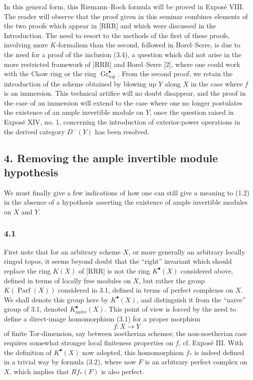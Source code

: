 \documentclass[11pt]{article}
\newcommand{\Gr}{\operatorname{Gr}}
\newcommand{\Parf}{\operatorname{Parf}}
\begin{document}
In this general form, this Riemann--Roch formula will be proved in Expos\'e VIII. The reader will observe that the proof given in this seminar combines elements of the two proofs which appear in [RRR] and which were discussed in the Introduction. The need to resort to the methods of the first of these proofs, involving more $K$-formalism than the second, followed in Borel--Serre, is due to the need for a proof of the inclusion (3.4), a question which did not arise in the more restricted framework of [RRR] and Borel--Serre [2], where one could work with the Chow ring or the ring $\Gr^\bullet_{\mathrm{top}}$. From the second proof, we retain the introduction of the scheme obtained by blowing up $Y$ along $X$ in the case where $f$ is an immersion. This technical artifice will no doubt disappear, and the proof in the case of an immersion will extend to the case where one no longer postulates the existence of an ample invertible module on $Y$, once the question raised in Expos\'e XIV, no. 1, concerning the introduction of exterior-power operations in the derived category $D^-(Y)$ has been resolved.

\subsection*{4. Removing the ample invertible module hypothesis}
We must finally give a few indications of how one can still give a meaning to (1.2) in the absence of a hypothesis asserting the existence of ample invertible modules on $X$ and $Y$.

\subsubsection*{4.1}
First note that for an arbitrary scheme $X$, or more generally an arbitrary locally ringed topos, it seems beyond doubt that the ``right'' invariant which should replace the ring $K(X)$ of [RRR] is not the ring $K^\bullet(X)$ considered above, defined in terms of locally free modules on $X$, but rather the group $K(\Parf(X))$ considered in 3.1, defined in terms of perfect complexes on $X$. We shall denote this group here by $K^\bullet(X)$, and distinguish it from the ``naive'' group of 3.1, denoted $K^\bullet_{\mathrm{naive}}(X)$. This point of view is forced by the need to define a direct-image homomorphism (3.1) for a proper morphism
\[
f:X\longrightarrow Y
\]
of finite Tor-dimension, say between noetherian schemes; the non-noetherian case requires somewhat stronger local finiteness properties on $f$, cf. Expos\'e III. With the definition of $K^\bullet(X)$ now adopted, this homomorphism $f_*$ is indeed defined in a trivial way by formula (3.2), where now $F$ is an arbitrary perfect complex on $X$, which implies that $Rf_*(F)$ is also perfect.
\end{document}
